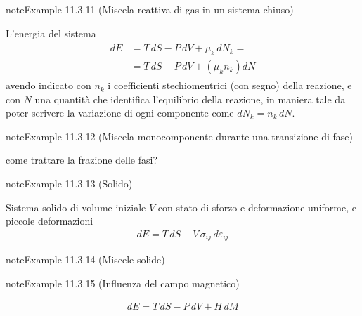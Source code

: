 \documentclass[letterpaper,10pt,italian]{jupyterBook}
\begin{document}
\begin{sphinxadmonition}{note}{Example 11.3.11 (Miscela reattiva di gas in un sistema chiuso)}



\sphinxAtStartPar
L’energia del sistema
\begin{equation*}
\begin{split}\begin{aligned}
  dE & = T \, dS - P \, dV + \mu_k \, dN_k = \\
     & = T \, dS - P \, dV + \left( \mu_k n_k \right) dN
\end{aligned}\end{split}
\end{equation*}
\sphinxAtStartPar
avendo indicato con \(n_k\) i coefficienti stechiomentrici (con segno) della reazione, e con \(N\) una quantità che identifica l’equilibrio della reazione, in maniera tale da poter scrivere la variazione di ogni componente come \(d N_k = n_k \, d N\).
\end{sphinxadmonition}
\label{ch/thermodynamics/principles-gibbs-phase-rule:example-14}
\begin{sphinxadmonition}{note}{Example 11.3.12 (Miscela monocomponente durante una transizione di fase)}



\sphinxAtStartPar
{} come trattare la frazione delle fasi?
\end{sphinxadmonition}
\label{ch/thermodynamics/principles-gibbs-phase-rule:example-15}
\begin{sphinxadmonition}{note}{Example 11.3.13 (Solido)}



\sphinxAtStartPar
Sistema solido di volume iniziale \(V\) con stato di sforzo e deformazione uniforme, e piccole deformazioni
\begin{equation*}
\begin{split}dE = T \, dS - V \, \sigma_{ij} \, d \varepsilon_{ij} \end{split}
\end{equation*}\end{sphinxadmonition}
\label{ch/thermodynamics/principles-gibbs-phase-rule:example-16}
\begin{sphinxadmonition}{note}{Example 11.3.14 (Miscele solide)}



\sphinxAtStartPar
{}
\end{sphinxadmonition}
\label{ch/thermodynamics/principles-gibbs-phase-rule:example-17}
\begin{sphinxadmonition}{note}{Example 11.3.15 (Influenza del campo magnetico)}


\begin{equation*}
\begin{split}dE = T \, dS - P \, d V + H \, dM\end{split}
\end{equation*}
\sphinxAtStartPar
{}
\end{sphinxadmonition}
\end{document}
